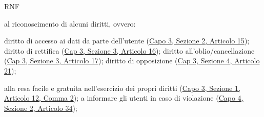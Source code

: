 \begin{listaPersonale}{RNF}
\begin{listaPersonale2}[RNF]{}
             al riconoscimento di alcuni diritti, ovvero:
\begin{listaPersonale3}[RNF]{}
                   diritto di accesso ai dati da parte dell'utente (\href{https://eur-lex.europa.eu/legal-content/IT/TXT/?uri=uriserv:OJ.L_.2016.119.01.0001.01.ITA&toc=OJ:L:2016:119:TOC#d1e2520-1-1}{Capo 3, Sezione 2, Articolo 15});
                   diritto di rettifica (\href{https://eur-lex.europa.eu/legal-content/IT/TXT/?uri=uriserv:OJ.L_.2016.119.01.0001.01.ITA&toc=OJ:L:2016:119:TOC#d1e2606-1-1}{Cap 3, Sezione 3, Articolo 16});
                   diritto all'oblio/cancellazione (\href{https://eur-lex.europa.eu/legal-content/IT/TXT/?uri=uriserv:OJ.L_.2016.119.01.0001.01.ITA&toc=OJ:L:2016:119:TOC#d1e2613-1-1}{Cap 3, Sezione 3, Articolo 17});
                   diritto di opposizione (\href{https://eur-lex.europa.eu/legal-content/IT/TXT/?uri=uriserv:OJ.L_.2016.119.01.0001.01.ITA&toc=OJ:L:2016:119:TOC#d1e2810-1-1}{Cap 3, Sezione 4, Articolo 21});
            \end{listaPersonale3}

             alla resa facile e gratuita nell'esercizio dei propri diritti (\href{https://eur-lex.europa.eu/legal-content/IT/TXT/?uri=uriserv:OJ.L_.2016.119.01.0001.01.ITA&toc=OJ:L:2016:119:TOC#d1e2189-1-1}{Capo 3, Sezione 1, Articolo 12, Comma 2});
             a informare gli utenti in caso di violazione (\href{https://eur-lex.europa.eu/legal-content/IT/TXT/?uri=uriserv:OJ.L_.2016.119.01.0001.01.ITA&toc=OJ:L:2016:119:TOC#d1e3497-1-1}{Capo 4, Sezione 2, Articolo 34});
      \end{listaPersonale2}



\end{listaPersonale}
